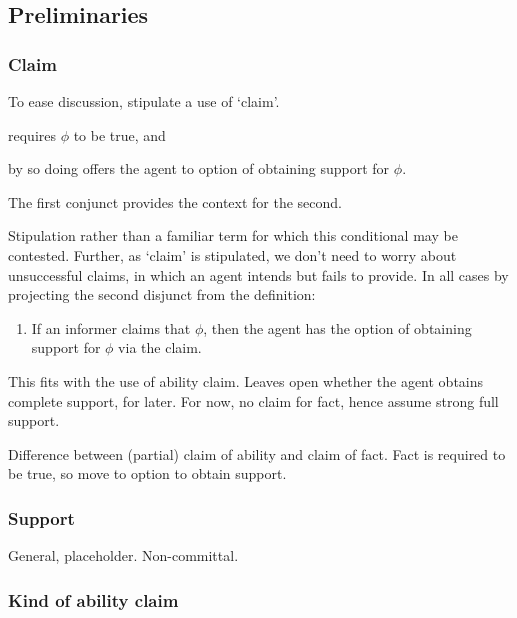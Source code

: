 \documentclass[10pt]{article}
\begin{document}
\subsection{Preliminaries}
\label{sec:preliminaries}

\subsubsection{Claim}
\label{sec:claim}

\begin{note}
  To ease discussion, stipulate a use of `claim'.
\begin{enumerate*}[label=\roman*)]
\item requires \(\phi\) to be true, and \item by so doing offers the agent to option of obtaining support for \(\phi\).
\end{enumerate*}
The first conjunct provides the context for the second.

Stipulation rather than a familiar term for which this conditional may be contested.
Further, as `claim' is stipulated, we don't need to worry about unsuccessful claims, in which an agent intends but fails to provide.
In all cases by projecting the second disjunct from the definition:
\begin{enumerate}
\item\label{cond:claim-to-opt-supp} If an informer claims that \(\phi\), then the agent has the option of obtaining support for \(\phi\) via the claim.
\end{enumerate}

This fits with the use of ability claim.
Leaves open whether the agent obtains complete support, for later.
For now, no claim for fact, hence assume strong full support.

Difference between (partial) claim of ability and claim of fact.
Fact is required to be true, so move to option to obtain support.
\end{note}

\subsubsection{Support}
\label{sec:support}

General, placeholder.
Non-committal.


\subsubsection{Kind of ability claim}
\label{sec:kind-ability-claim}
\end{document}
